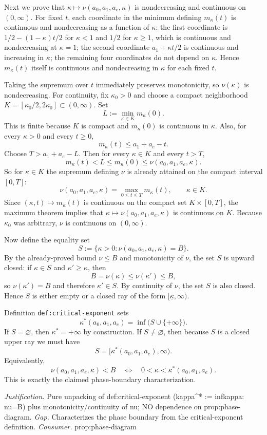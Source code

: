 \documentclass{article}
\begin{document}
Next we prove that $\kappa\mapsto \nu(a_0,a_1,a_e,\kappa)$ is nondecreasing and continuous on $(0,\infty)$. For fixed $t$, each coordinate in the minimum defining $m_\kappa(t)$ is continuous and nondecreasing as a function of $\kappa$: the first coordinate is $1/2-(1-\kappa)t/2$ for $\kappa<1$ and $1/2$ for $\kappa\ge 1$, which is continuous and nondecreasing at $\kappa=1$; the second coordinate $a_1+\kappa t/2$ is continuous and increasing in $\kappa$; the remaining four coordinates do not depend on $\kappa$. Hence $m_\kappa(t)$ itself is continuous and nondecreasing in $\kappa$ for each fixed $t$.

Taking the supremum over $t$ immediately preserves monotonicity, so $\nu(\kappa)$ is nondecreasing. For continuity, fix $\kappa_0>0$ and choose a compact neighborhood $K=[\kappa_0/2,2\kappa_0]\subset(0,\infty)$. Set
\[
L:=\min_{\kappa\in K} m_\kappa(0).
\]
This is finite because $K$ is compact and $m_\kappa(0)$ is continuous in $\kappa$. Also, for every $\kappa>0$ and every $t\ge 0$,
\[
m_\kappa(t)\le a_1+a_e-t.
\]
Choose $T>a_1+a_e-L$. Then for every $\kappa\in K$ and every $t>T$,
\[
m_\kappa(t) < L \le m_\kappa(0) \le \nu(a_0,a_1,a_e,\kappa).
\]
So for $\kappa\in K$ the supremum defining $\nu$ is already attained on the compact interval $[0,T]$:
\[
\nu(a_0,a_1,a_e,\kappa)=\max_{0\le t\le T} m_\kappa(t),\qquad \kappa\in K.
\]
Since $(\kappa,t)\mapsto m_\kappa(t)$ is continuous on the compact set $K\times[0,T]$, the maximum theorem implies that $\kappa\mapsto \nu(a_0,a_1,a_e,\kappa)$ is continuous on $K$. Because $\kappa_0$ was arbitrary, $\nu$ is continuous on $(0,\infty)$.

Now define the equality set
\[
S:=\{\kappa>0: \nu(a_0,a_1,a_e,\kappa)=B\}.
\]
By the already-proved bound $\nu\le B$ and monotonicity of $\nu$, the set $S$ is upward closed: if $\kappa\in S$ and $\kappa'\ge \kappa$, then
\[
B=\nu(\kappa)\le \nu(\kappa')\le B,
\]
so $\nu(\kappa')=B$ and therefore $\kappa'\in S$. By continuity of $\nu$, the set $S$ is also closed. Hence $S$ is either empty or a closed ray of the form $[\underline\kappa,\infty)$.

Definition \texttt{def:critical-exponent} sets
\[
\kappa^*(a_0,a_1,a_e)=\inf\bigl(S\cup\{+\infty\}\bigr).
\]
If $S=\varnothing$, then $\kappa^*=+\infty$ by construction. If $S\neq\varnothing$, then because $S$ is a closed upper ray we must have
\[
S=[\kappa^*(a_0,a_1,a_e),\infty).
\]
Equivalently,
\[
\nu(a_0,a_1,a_e,\kappa)<B
\quad\Longleftrightarrow\quad
0<\kappa<\kappa^*(a_0,a_1,a_e).
\]
This is exactly the claimed phase-boundary characterization.
\par\smallskip\noindent \textit{Justification.} Pure unpacking of def:critical-exponent (kappa^* := inf{kappa: nu=B}) plus monotonicity/continuity of nu; NO dependence on prop:phase-diagram. \textit{Gap.} Characterizes the phase boundary from the critical-exponent definition. \textit{Consumer.} prop:phase-diagram
\end{document}
